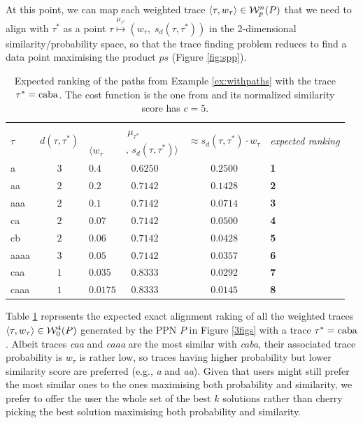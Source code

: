 At this point, we can map each weighted trace  $\braket{\tau,w_\tau}\in\mathcal{W}_p^n(P)$ that we need to align with $\tau^*$ as a point $\tau\overset{\mu_{\tau^*}}{\mapsto}(w_\tau,\; s_d(\tau,\tau^*))$ in the 2-dimensional similarity/probability space, so that the trace finding problem reduces to find a data point maximising the product $ps$ (Figure \ref{fig:spp}).

\begin{table}[!t]
\centering
\caption{Expected ranking of the paths from Example \ref{ex:withpaths} with the trace $\tau^*=\textup{caba}$. The cost function is the one from \cite{LeoniM17} and its normalized similarity score has $c=5$.}\label{tab:expected}
\begin{tabular}{lc|ll|cl}
	\toprule
	
	\multirow{2}{*}{$\tau$} & 
	\multirow{2}{*}{$d(\tau,\tau^*)$} & 
	\multicolumn{2}{c|}{$\mu_{\tau^*}$} &
	 \multirow{2}{*}{$\approx s_d(\tau,\tau^*)\cdot w_\tau$} & \multirow{2}{*}{\textit{expected ranking}}\\
	 
	\cline{3-4} &&  $\langle w_\tau$ &  $,\,s_d(\tau,\tau^*)\rangle $ &&\\
	 
	\midrule
	{a}  & $3$ & $0.4$ & $\;\; 0.6250$  & $0.2500$ & \textbf{1}\\
	{aa}  & $2$ & $0.2$ & $\;\; 0.7142$ & $0.1428$ & \textbf{2}\\
	{aaa}  & $2$ & $0.1$ & $\;\; 0.7142$ & $0.0714$ & \textbf{3}\\
	{ca}  & $2$ & $0.07$ & $\;\; 0.7142$ & $0.0500$ & \textbf{4}\\
	{cb}  & $2$ & $0.06$ & $\;\; 0.7142$ & $0.0428$ & \textbf{5}\\
	{aaaa}  & $3$ & $0.05$ & $\;\; 0.7142$ & $0.0357$ & \textbf{6}\\
	{caa}  & $1$ & $0.035$ & $\;\; 0.8333$ & $0.0292$ &  \textbf{7}\\
	{caaa}  & $1$  & $0.0175$ & $\;\; 0.8333$ & $0.0145$ & \textbf{8}\\
	\bottomrule
\end{tabular}
\end{table}
\begin{example}\label{ex:rankingTaus}
Table \ref{tab:expected} represents the expected exact alignment raking of all the weighted traces $\braket{\tau,w_\tau}\in\mathcal{W}_0^4(P)$ generated by the PPN $P$ in Figure \ref{3figs} with a trace $\tau^*=\textup{caba}$.  Albeit traces \textit{caa} and \textit{caaa} are the most similar with \textit{caba}, their associated trace probability is $w_\tau$ is rather low, so traces having higher probability but lower similarity score are preferred (e.g., \textit{a} and \textit{aa}). Given that users might still prefer the most similar ones to the ones maximising both probability and similarity, we prefer to offer the user the whole set of the best $k$ solutions rather than cherry picking the best solution maximising both probability and similarity.
\end{example}


